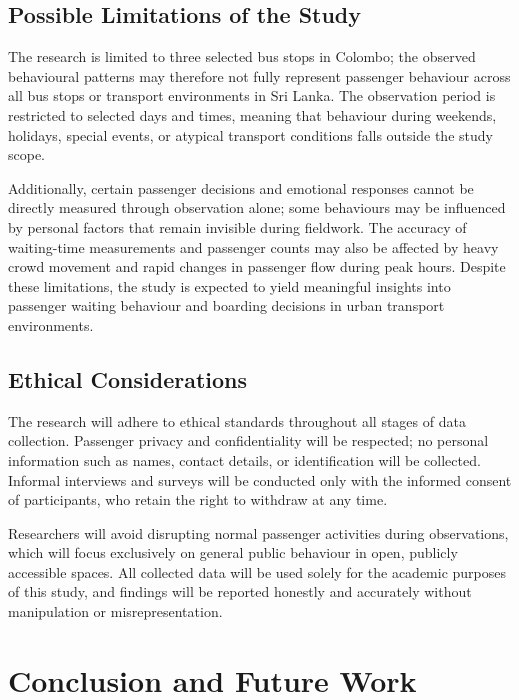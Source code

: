\documentclass[12pt, a4paper]{report}
\begin{document}
\section{Possible Limitations of the Study}

The research is limited to three selected bus stops in Colombo; the observed behavioural
patterns may therefore not fully represent passenger behaviour across all bus stops or
transport environments in Sri Lanka. The observation period is restricted to selected days
and times, meaning that behaviour during weekends, holidays, special events, or atypical
transport conditions falls outside the study scope.

Additionally, certain passenger decisions and emotional responses cannot be directly
measured through observation alone; some behaviours may be influenced by personal
factors that remain invisible during fieldwork. The accuracy of waiting-time measurements
and passenger counts may also be affected by heavy crowd movement and rapid changes in
passenger flow during peak hours. Despite these limitations, the study is expected to yield
meaningful insights into passenger waiting behaviour and boarding decisions in urban
transport environments.

\section{Ethical Considerations}

The research will adhere to ethical standards throughout all stages of data collection.
Passenger privacy and confidentiality will be respected; no personal information such as
names, contact details, or identification will be collected. Informal interviews and surveys
will be conducted only with the informed consent of participants, who retain the right to
withdraw at any time.

Researchers will avoid disrupting normal passenger activities during observations, which
will focus exclusively on general public behaviour in open, publicly accessible spaces. All
collected data will be used solely for the academic purposes of this study, and findings will
be reported honestly and accurately without manipulation or misrepresentation.

\chapter{Conclusion and Future Work}
\end{document}

